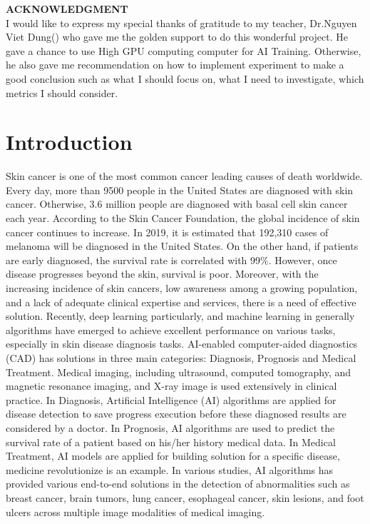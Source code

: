 \textbf{ACKNOWLEDGMENT} \\ 
I would like to express my special thanks of gratitude to my teacher, Dr.Nguyen Viet Dung() who gave me the golden support to do this wonderful project. He gave a chance to use High GPU computing computer for AI Training. Otherwise, he also gave me recommendation on how to implement experiment to make a good conclusion such as what I should focus on, what I need to investigate, which metrics I should consider.  
\section{Introduction}
Skin cancer is one of the most common cancer leading causes of death worldwide. Every day, more than 9500\cite{03358} people in the United States are diagnosed with skin cancer. Otherwise, 3.6\cite{03358} million people are diagnosed with basal cell skin cancer each year. According to the Skin Cancer Foundation, the global incidence of skin cancer continues to increase\cite{11872}. In 2019, it is estimated that 192,310 cases of melanoma will be diagnosed in the United States\cite{11872}. On the other hand, if patients are early diagnosed, the survival rate is correlated with 99\%. However, once disease progresses beyond the skin, survival is poor\cite{11872}. Moreover, with the increasing
incidence of skin cancers, low awareness among a growing population, and a lack of adequate clinical expertise and services, there is a need of effective solution. \newline
Recently, deep learning particularly, and machine learning in generally algorithms have emerged to achieve excellent performance on various tasks, especially in skin disease diagnosis tasks. AI-enabled computer-aided diagnostics (CAD) has solutions in three main categories: Diagnosis, Prognosis and Medical Treatment. Medical imaging, including ultrasound, computed tomography, and magnetic resonance imaging, and X-ray image is used extensively in clinical practice. In Diagnosis, Artificial Intelligence (AI) algorithms are applied for disease detection to save progress execution before these diagnosed results are considered by a doctor. In Prognosis, AI algorithms are used to predict the survival rate of a patient based on his/her history medical data. In Medical Treatment, AI models are applied for building solution for a specific disease, medicine revolutionize is an example. In various studies, AI algorithms has provided various end-to-end solutions in the detection of abnormalities such as breast cancer, brain tumors, lung cancer, esophageal cancer, skin lesions, and foot ulcers across multiple image modalities of medical imaging\cite{11872}. \\
